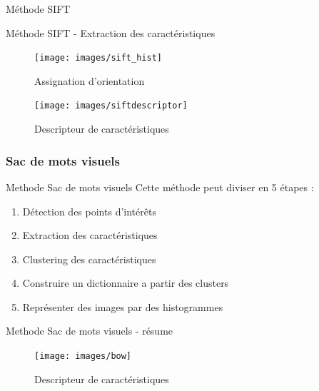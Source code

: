 \documentclass[11pt]{beamer}
\begin{document}
\begin{otherlanguage}{french}
\begin{frame}{Méthode SIFT}
\end{frame}

\begin{frame}{Méthode SIFT - Extraction des caractéristiques}

\begin{figure}[ht!]
\centering
\texttt{[image: images/sift\_hist]}
\caption{Assignation d'orientation}
\label{max_margin}
\end{figure}

\begin{figure}[ht!]
\centering
\texttt{[image: images/siftdescriptor]}
\caption{Descripteur de caractéristiques}
\label{max_margin}
\end{figure}

\end{frame}

\subsubsection*{Sac de mots visuels}
\begin{frame}{Methode Sac de mots visuels}
Cette méthode peut diviser en 5 étapes :
\begin{enumerate}
\item Détection des points d'intérêts
\item Extraction des caractéristiques
\item Clustering des caractéristiques
\item Construire un dictionnaire a partir des clusters
\item Représenter des images par des histogrammes
\end{enumerate}
\end{frame}

\begin{frame}{Methode Sac de mots visuels - résume}

\begin{figure}[ht!]
\centering
\texttt{[image: images/bow]}
\caption{Descripteur de caractéristiques}
\label{max_margin}
\end{figure}

\end{frame}


\end{otherlanguage}
\end{document}

